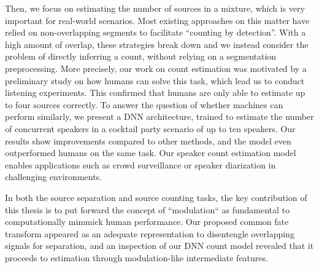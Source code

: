 Then, we focus on estimating the number of sources in a mixture, which is very important for real-world scenarios.
Most existing approaches on this matter have relied on non-overlapping segments to facilitate ``counting by detection''.
With a high amount of overlap, these strategies break down and we instead consider the problem of directly inferring a count, without relying on a segmentation preprocessing.
More precisely, our work on count estimation was motivated by a preliminary study on how humans can solve this task, which lead us to conduct listening experiments. This confirmed that humans are only able to estimate up to four sources correctly.
To answer the question of whether machines can perform similarly, we present a DNN architecture, trained to estimate the number of concurrent speakers in a cocktail party scenario of up to ten speakers.
Our results show improvements compared to other methods, and the model even outperformed humans on the same task.
Our speaker count estimation model enables applications such as crowd surveillance or speaker diarization in challenging environments.

In both the source separation and source counting tasks, the key contribution of this thesis is to put forward the concept of ``modulation`` as fundamental to computationally mimmick human performance. Our proposed common fate transform appeared as an adequate representation to disentengle overlapping signals for separation, and an inspection of our DNN count model revealed that it proceeds to estimation through modulation-like intermediate features.

\vfill

